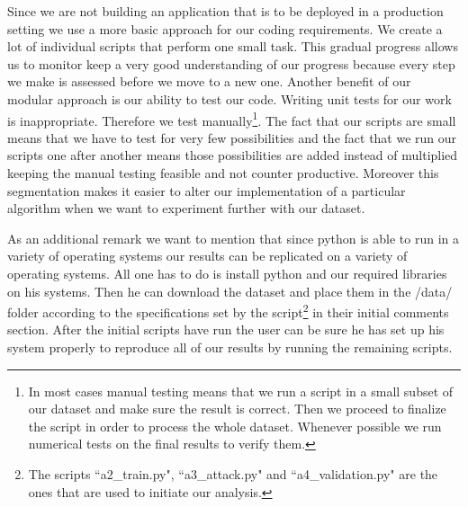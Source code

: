 \documentclass[reqno,openany,12pt]{amsbook}
\begin{document}
Since we are not building an application that is to be deployed in a production setting we use a more basic approach for our coding requirements. We create a lot of individual scripts that perform one small task. This gradual progress allows us to monitor keep a very good understanding of our progress because every step we make is assessed before we move to a new one. Another benefit of our modular approach is our ability to test our code. Writing unit tests for our work is inappropriate. Therefore we test manually\footnote{In most cases manual testing means that we run a script in a small subset of our dataset and make sure the result is correct. Then we proceed to finalize the script in order to process the whole dataset. Whenever possible we run numerical tests on the final results to verify them.}. The fact that our scripts are small means that we have to test for very few possibilities and the fact that we run our scripts one after another means those possibilities are added instead of multiplied keeping the manual testing feasible and not counter productive. Moreover this segmentation makes it easier to alter our implementation of a particular algorithm when we want to experiment further with our dataset.

As an additional remark we want to mention that  since python is able to run in a variety of operating systems our results can be replicated on a variety of operating systems. All one has to do is install python and our required libraries on his systems. Then he can download the dataset and place them in the /data/ folder according to the specifications set by the script\footnote{The scripts ``a2\_{}train.py", ``a3\_{}attack.py" and ``a4\_{}validation.py" are the ones that are used to initiate our analysis.} in their initial comments section. After the initial scripts have run the user can be sure he has set up his system properly to reproduce all of our results by running the remaining scripts.
\end{document}
